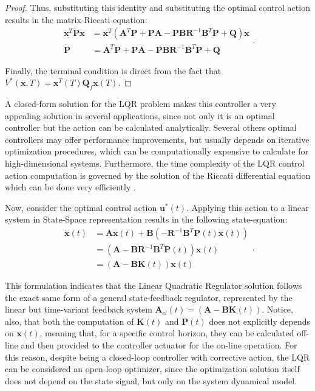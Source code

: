 \documentclass[a4paper,11pt]{book}
\numberwithin{figure}{chapter}
\numberwithin{equation}{chapter}
\numberwithin{table}{chapter}
\theoremstyle{definition}
\begin{document}
\begin{proof}
\noindent Thus, substituting this identity and substituting the optimal control action results in the matrix Riccati equation:
    \begin{equation}
    \begin{split}
    \bm{x}^T \dot{\bm{P}} \bm{x} &= \bm{x}^T (\bm{A}^T \bm{P} + \bm{P} \bm{A} - \bm{P} \bm{B} \bm{R}^{-1} \bm{B}^T \bm{P} + \bm{Q}) \bm{x} \\
    \dot{\bm{P}} &= \bm{A}^T \bm{P} + \bm{P} \bm{A} - \bm{P} \bm{B} \bm{R}^{-1} \bm{B}^T \bm{P} + \bm{Q}
    \end{split}
    .\end{equation}
    
\noindent Finally, the terminal condition is direct from the fact that $V^*(\bm{x}, T) = \bm{x}^T(T) \bm{Q}_f \bm{x}(T)$.
\end{proof}

A closed-form solution for the LQR problem makes this controller a very appealing solution in several applications, since not only it is an optimal controller but the action can be calculated analytically. Several others optimal controllers may offer performance improvements, but usually depends on iterative optimization procedures, which can be computationally expensive to calculate for high-dimensional systems. Furthermore, the time complexity of the LQR control action computation is governed by the solution of the Riccati differential equation which can be done very efficiently \cite{Davison:1973, Opanuga:2015}.

Now, consider the optimal control action $\bm{u}^*(t)$. Applying this action to a linear system in State-Space representation results in the following state-equation:
\begin{equation}
\begin{split}
    \dot{\bm{x}}(t) &= \bm{A} \bm{x}(t) + \bm{B} \left( -\bm{R}^{-1} \bm{B}^T \bm{P}(t) \bm{x}(t) \right) \\
        & = \left( \bm{A} - \bm{B} \bm{R}^{-1} \bm{B}^T \bm{P}(t) \right) \bm{x}(t) \\
        & = \left( \bm{A} - \bm{B} \bm{K}(t) \right) \bm{x}(t)
\end{split}
.\end{equation}

This formulation indicates that the Linear Quadratic Regulator solution follows the exact same form of a general state-feedback regulator, represented by the linear but time-variant feedback system $\bm{A}_{cl}(t) = \left( \bm{A} - \bm{B} \bm{K}(t) \right)$. Notice, also, that both the computation of $\bm{K}(t)$ and $\bm{P}(t)$ does not explicitly depends on $\bm{x}(t)$, meaning that, for a specific control horizon, they can be calculated off-line and then provided to the controller actuator for the on-line operation. For this reason, despite being a closed-loop controller with corrective action, the LQR can be considered an open-loop optimizer, since the optimization solution itself does not depend on the state signal, but only on the system dynamical model.
\end{document}
